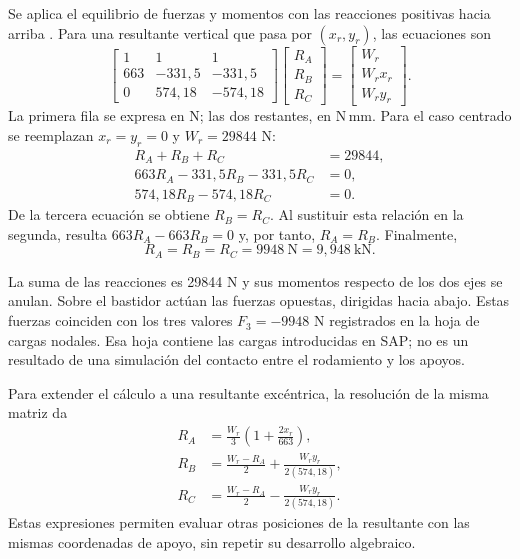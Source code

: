 Se aplica el equilibrio de fuerzas y momentos con las reacciones positivas hacia arriba \cite{shigley2015}. Para una resultante vertical que pasa por $(x_r,y_r)$, las ecuaciones son
\begin{equation}
\begin{bmatrix}
1&1&1\\
663&-331{,}5&-331{,}5\\
0&574{,}18&-574{,}18
\end{bmatrix}
\begin{bmatrix}R_A\\R_B\\R_C\end{bmatrix}
=
\begin{bmatrix}W_r\\W_r x_r\\W_r y_r\end{bmatrix}.
\label{eq:manual_matriz_pad}
\end{equation}
La primera fila se expresa en N; las dos restantes, en N\,mm. Para el caso centrado se reemplazan $x_r=y_r=0$ y $W_r=29844$ N:
\begin{align}
R_A+R_B+R_C &=29844,\\
663R_A-331{,}5R_B-331{,}5R_C&=0,\\
574{,}18R_B-574{,}18R_C&=0.
\end{align}
De la tercera ecuación se obtiene $R_B=R_C$. Al sustituir esta relación en la segunda, resulta $663R_A-663R_B=0$ y, por tanto, $R_A=R_B$. Finalmente,
\begin{equation}
\boxed{R_A=R_B=R_C=9948\ \mathrm{N}=9{,}948\ \mathrm{kN}.}
\label{eq:manual_reacciones_pad}
\end{equation}

La suma de las reacciones es 29844 N y sus momentos respecto de los dos ejes se anulan. Sobre el bastidor actúan las fuerzas opuestas, dirigidas hacia abajo. Estas fuerzas coinciden con los tres valores $F_3=-9948$ N registrados en la hoja de cargas nodales. Esa hoja contiene las cargas introducidas en SAP; no es un resultado de una simulación del contacto entre el rodamiento y los apoyos.

Para extender el cálculo a una resultante excéntrica, la resolución de la misma matriz da
\begin{align}
R_A&=\frac{W_r}{3}\left(1+\frac{2x_r}{663}\right),\\
R_B&=\frac{W_r-R_A}{2}+\frac{W_r y_r}{2(574{,}18)},\\
R_C&=\frac{W_r-R_A}{2}-\frac{W_r y_r}{2(574{,}18)}.
\label{eq:manual_pad_general}
\end{align}
Estas expresiones permiten evaluar otras posiciones de la resultante con las mismas coordenadas de apoyo, sin repetir su desarrollo algebraico.

